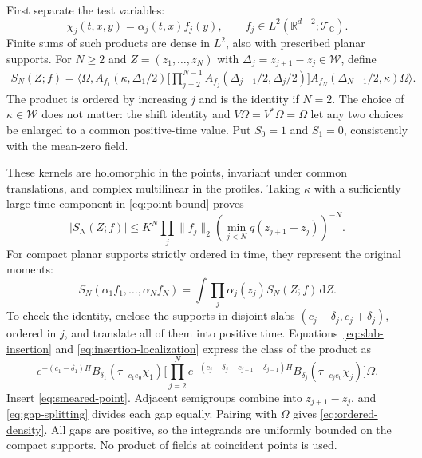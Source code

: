 \documentclass[11pt, letterpaper, reqno]{amsart}
\theoremstyle{definition}
\theoremstyle{remark}
\newcommand{\bbC}{\mathbb{C}}
\newcommand{\bbR}{\mathbb{R}}
\newcommand{\calT}{\mathcal{T}}
\newcommand{\calW}{\mathcal{W}}
\newcommand{\dd}{\,\mathrm{d}}
\begin{document}
First separate the test variables:
\begin{equation}
 \chi_j(t,x,y)=\alpha_j(t,x)f_j(y),\qquad
 f_j\in L^2(\bbR^{d-2};\calT_\bbC).
\end{equation}
Finite sums of such products are dense in $L^2$, also with prescribed
planar supports. For $N\geq2$ and $Z=(z_1,\dots,z_N)$ with
$\Delta_j=z_{j+1}-z_j\in\calW$, define
\begin{equation}\label{eq:ordered-kernel}
\begin{split}
 S_N(Z;f)=\big\langle\Omega,
 A_{f_1}(\kappa,\Delta_1/2)
 \Big[\prod_{j=2}^{N-1}A_{f_j}(\Delta_{j-1}/2,\Delta_j/2)\Big]
 A_{f_N}(\Delta_{N-1}/2,\kappa)\Omega\big\rangle.
\end{split}
\end{equation}
The product is ordered by increasing $j$ and is the identity if $N=2$.
The choice of $\kappa\in\calW$ does not matter: the shift identity and
$V\Omega=V^*\Omega=\Omega$ let any two choices be enlarged to a common
positive-time value. Put $S_0=1$ and $S_1=0$, consistently with the
mean-zero field.

These kernels are holomorphic in the points, invariant under common
translations, and complex multilinear in the profiles. Taking
$\kappa$ with a sufficiently large time component in
\eqref{eq:point-bound} proves
\begin{equation}\label{eq:kernel-estimate}
 |S_N(Z;f)|\leq K^N\prod_j\|f_j\|_2
      \left(\min_{j<N}q(z_{j+1}-z_j)\right)^{-N}.
\end{equation}
For compact planar supports strictly ordered in time, they represent
the original moments:
\begin{equation}\label{eq:ordered-density}
 S_N(\alpha_1f_1,\dots,\alpha_Nf_N)
 =\int\prod_j\alpha_j(z_j)S_N(Z;f)\dd Z.
\end{equation}
To check the identity, enclose the supports in disjoint slabs
$(c_j-\delta_j,c_j+\delta_j)$, ordered in $j$, and translate all of
them into positive time. Equations~\eqref{eq:slab-insertion} and
\eqref{eq:insertion-localization} express the class of the product as
\begin{equation}\label{eq:ordered-product}
 e^{-(c_1-\delta_1)H}B_{\delta_1}(\tau_{-c_1e_0}\chi_1)
 \Big[\prod_{j=2}^N e^{-(c_j-\delta_j-c_{j-1}-\delta_{j-1})H}
 B_{\delta_j}(\tau_{-c_je_0}\chi_j)\Big]\Omega.
\end{equation}
Insert \eqref{eq:smeared-point}. Adjacent semigroups combine into
$z_{j+1}-z_j$, and \eqref{eq:gap-splitting} divides each gap equally.
Pairing with $\Omega$ gives \eqref{eq:ordered-density}. All gaps are
positive, so the integrands are uniformly bounded on the compact
supports. No product of fields at coincident points is used.
\end{document}
